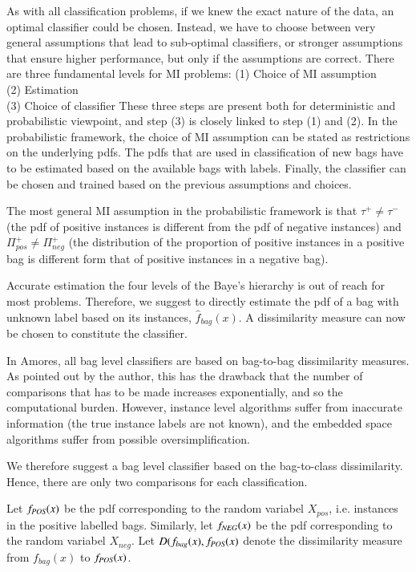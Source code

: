 As with all classification problems, if we knew the exact nature of the data, an optimal classifier could be chosen. 
Instead, we have to choose between very general assumptions that lead to sub-optimal classifiers, or stronger assumptions that ensure higher performance, but only if the assumptions are correct. 
There are three fundamental levels for MI problems:
(1) Choice of MI assumption \\
(2) Estimation \\
(3) Choice of classifier
These three steps are present both for deterministic and probabilistic viewpoint, and step (3) is closely linked to step (1) and (2). 
In the probabilistic framework, the choice of MI assumption can be stated as restrictions on the underlying pdfs. 
The pdfs that are used in classification of new bags have to be estimated based on the available bags with labels. 
Finally, the classifier can be chosen and trained based on the previous assumptions and choices. 

The most general MI assumption in the probabilistic framework is that $\tau^+ \neq \tau^-$ (the pdf of positive instances is different from the pdf of negative instances) and $\Pi_{pos}^+ \neq \Pi_{neg}^+$ (the distribution of the proportion of positive instances in a positive bag is different form that of positive instances in a negative bag). 

Accurate estimation the four levels of the Baye's hierarchy is out of reach for most problems. 
Therefore, we suggest to directly estimate the pdf of a bag with unknown label based on its instances, $\hat{f}_{bag}(x)$.
A dissimilarity measure can now be chosen to constitute the classifier. 

In Amores, all bag level classifiers are based on bag-to-bag dissimilarity measures. 
As pointed out by the author, this has the drawback that the number of comparisons that has to be made increases exponentially, and so the computational burden.
However, instance level algorithms suffer from inaccurate information (the true instance labels are not known), and the embedded space algorithms suffer from possible oversimplification. 

We therefore suggest a bag level classifier based on the bag-to-class dissimilarity. 
Hence, there are only two comparisons for each classification. 

Let $f_{\text{\scriptsize{{\it POS}}}}(x)$ be the pdf corresponding to the random variabel $X_{pos}$, i.e. instances in the positive labelled bags. Similarly, let $f_{\text{\scriptsize{{\it NEG}}}}(x)$ be the pdf corresponding to the random variabel $X_{neg}$.
Let $D(f_{bag}(x), f_{\text{\scriptsize{{\it POS}}}}(x)$ denote the dissimilarity measure from $f_{bag}(x)$ to $f_{\text{\scriptsize{{\it POS}}}}(x)$.

